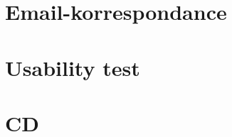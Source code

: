 \chapter{Email-korrespondance}


\chapter{Usability test}

%

\chapter{CD}





\label{LASTAPPENDIX}
